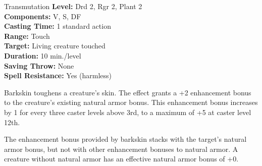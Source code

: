{Transmutation}
{
	\textbf{Level:}
	Drd 2, Rgr 2, Plant 2\\
	\textbf{Components:}
	V, S, DF\\
	\textbf{Casting Time:}
	1 standard action\\
	\textbf{Range:}
	Touch\\
	\textbf{Target:}
	Living creature touched\\
	\textbf{Duration:}
	10 min./level\\
	\textbf{Saving Throw:}
	None\\
	\textbf{Spell Resistance:}
	Yes (harmless)\\
}
{
	Barkskin toughens a creature's skin. The effect grants a +2 enhancement bonus to the creature's existing natural armor bonus. This enhancement bonus increases by 1 for every three caster levels above 3rd, to a maximum of +5 at caster level 12th.

	The enhancement bonus provided by barkskin stacks with the target's natural armor bonus, but not with other enhancement bonuses to natural armor. A creature without natural armor has an effective natural armor bonus of +0.

}

